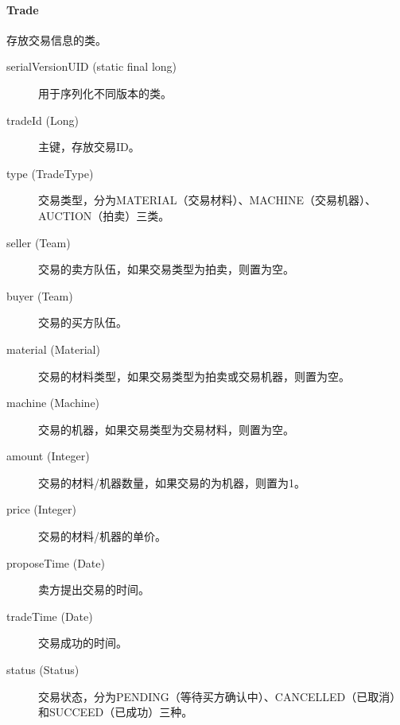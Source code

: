 \documentclass{article}
\begin{document}
\paragraph{Trade}
存放交易信息的类。
\begin{description}
  \item[serialVersionUID (static final long)] 用于序列化不同版本的类。
  \item[tradeId (Long)] 主键，存放交易ID。
  \item[type (TradeType)] 交易类型，分为MATERIAL（交易材料）、MACHINE（交易机器）、AUCTION（拍卖）三类。
  \item[seller (Team)] 交易的卖方队伍，如果交易类型为拍卖，则置为空。
  \item[buyer (Team)] 交易的买方队伍。
  \item[material (Material)] 交易的材料类型，如果交易类型为拍卖或交易机器，则置为空。
  \item[machine (Machine)] 交易的机器，如果交易类型为交易材料，则置为空。
  \item[amount (Integer)] 交易的材料/机器数量，如果交易的为机器，则置为1。
  \item[price (Integer)] 交易的材料/机器的单价。
  \item[proposeTime (Date)] 卖方提出交易的时间。
  \item[tradeTime (Date)] 交易成功的时间。
  \item[status (Status)] 交易状态，分为PENDING（等待买方确认中）、CANCELLED（已取消）和SUCCEED（已成功）三种。
\end{description}
\end{document}
